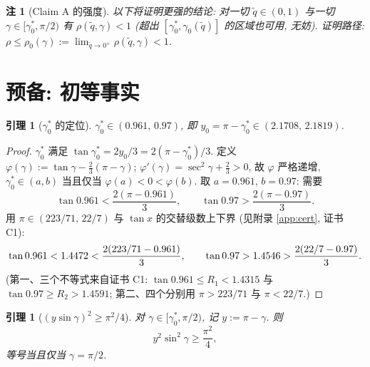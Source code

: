 \documentclass[UTF8]{ctexart}
\newtheorem{lemma}[theorem]{引理}
\newtheorem{remark}[theorem]{注}
\begin{document}
\begin{remark}[Claim A 的强度]\label{rem:stronger}
以下将证明更强的结论: 对一切 $\tilde q\in(0,1)$ 与一切
$\gamma\in[\gamma_0^*,\pi/2)$ 有 $\rho(\tilde q,\gamma)<1$ (超出
$[\gamma_0^*,\gamma_0(\tilde q)]$ 的区域也可用, 无妨). 证明路径:
$\rho\le\rho_0(\gamma):=\lim_{\tilde q\to0^+}\rho(\tilde q,\gamma)<1$.
\end{remark}

\section{预备: 初等事实}\label{sec:elem}

\begin{lemma}[$\gamma_0^*$ 的定位]\label{lem:gstar}
$\gamma_0^*\in(0.961,\,0.97)$, 即 $y_0=\pi-\gamma_0^*\in(2.1708,\,2.1819)$.
\end{lemma}

\begin{proof}
$\gamma_0^*$ 满足 $\tan\gamma_0^*=2y_0/3=2(\pi-\gamma_0^*)/3$. 定义
$\varphi(\gamma):=\tan\gamma-\frac23(\pi-\gamma)$;
$\varphi'(\gamma)=\sec^2\gamma+\frac23>0$, 故 $\varphi$ 严格递增,
$\gamma_0^*\in(a,b)$ 当且仅当 $\varphi(a)<0<\varphi(b)$. 取
$a=0.961$, $b=0.97$: 需要
\begin{equation*}
	\tan0.961<\frac{2(\pi-0.961)}{3},\qquad
	\tan0.97>\frac{2(\pi-0.97)}{3}.
\end{equation*}
用 $\pi\in(223/71,\,22/7)$ 与 $\tan x$ 的交替级数上下界 (见附录
\ref{app:cert}, 证书 C1):
\begin{equation*}
	\tan0.961<1.4472<\frac{2(223/71-0.961)}{3},
	\qquad
	\tan0.97>1.4546>\frac{2(22/7-0.97)}{3}.
	\qedhere
\end{equation*}
(第一、三个不等式来自证书 C1: $\tan0.961\le R_1<1.4315$ 与
$\tan0.97\ge R_2>1.4591$; 第二、四个分别用 $\pi>223/71$ 与 $\pi<22/7$.)
\end{proof}

\begin{lemma}[$(y\sin\gamma)^2\ge\pi^2/4$]\label{lem:ys2}
对 $\gamma\in[\gamma_0^*,\pi/2)$, 记 $y:=\pi-\gamma$. 则
\begin{equation}
	y^2\sin^2\gamma\ge\frac{\pi^2}{4},
	\label{eq:ys2}
\end{equation}
等号当且仅当 $\gamma=\pi/2$.
\end{lemma}
\end{document}

